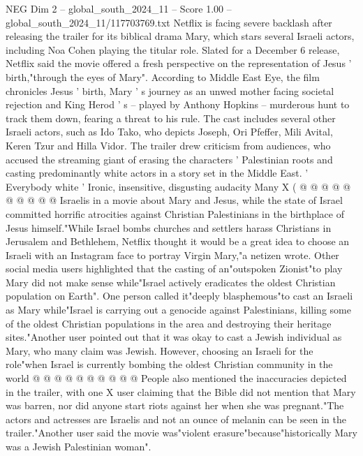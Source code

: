 \begin{textsample}{NEG Dim 2 – global\_south\_2024\_11 – Score 1.00 – global\_south\_2024\_11/117703769.txt}  \label{ex:f2_neg_273}
Netflix is facing severe backlash after releasing the trailer for its biblical drama Mary, which stars several Israeli actors, including Noa Cohen playing the titular role.
Slated for a December 6 release, Netflix said the movie offered a fresh perspective on the representation of Jesus ' birth,"through the eyes of Mary".
According to Middle East Eye, the film chronicles Jesus ' birth, Mary ' s journey as an unwed mother facing societal rejection and King Herod ' s -- played by Anthony Hopkins -- murderous hunt to track them down, fearing a threat to his rule.
The cast includes several other Israeli actors, such as Ido Tako, who depicts Joseph, Ori Pfeffer, Mili Avital, Keren Tzur and Hilla Vidor.
The trailer drew criticism from audiences, who accused the streaming giant of erasing the characters ' Palestinian roots and casting predominantly white actors in a story set in the Middle East. ' Everybody white ' Ironic, insensitive, disgusting audacity Many X ( @ @ @ @ @ @ @ @ @ @ Israelis in a movie about Mary and Jesus, while the state of Israel committed horrific atrocities against Christian Palestinians in the birthplace of Jesus himself."While Israel bombs churches and settlers harass Christians in Jerusalem and Bethlehem, Netflix thought it would be a great idea to choose an Israeli with an Instagram face to portray Virgin Mary,"a netizen wrote.
Other social media users highlighted that the casting of an"outspoken Zionist"to play Mary did not make sense while"Israel actively eradicates the oldest Christian population on Earth".
One person called it"deeply blasphemous"to cast an Israeli as Mary while"Israel is carrying out a genocide against Palestinians, killing some of the oldest Christian populations in the area and destroying their heritage sites."Another user pointed out that it was okay to cast a Jewish individual as Mary, who many claim was Jewish.
However, choosing an Israeli for the role"when Israel is currently bombing the oldest Christian community in the world @ @ @ @ @ @ @ @ @ @ People also mentioned the inaccuracies depicted in the trailer, with one X user claiming that the Bible did not mention that Mary was barren, nor did anyone start riots against her when she was pregnant."The actors and actresses are Israelis and not an ounce of melanin can be seen in the trailer."Another user said the movie was"violent erasure"because"historically Mary was a Jewish Palestinian woman".

\end{textsample}
